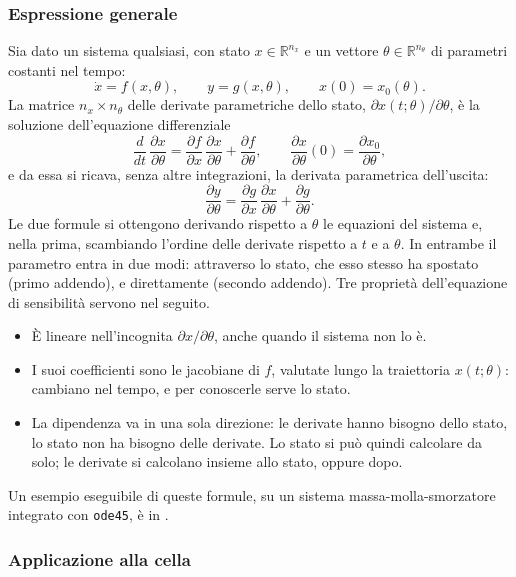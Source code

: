\documentclass[11pt,a4paper]{article}
\newcommand{\file}[1]{\texttt{\detokenize{#1}}}
\begin{document}
\subsubsection{Espressione generale}

Sia dato un sistema qualsiasi, con stato $x \in \mathbb{R}^{n_x}$ e un vettore
$\theta \in \mathbb{R}^{n_\theta}$ di parametri costanti nel tempo:
\[
  \dot x = f(x, \theta), \qquad y = g(x, \theta), \qquad x(0) = x_0(\theta) .
\]
La matrice $n_x \times n_\theta$ delle derivate parametriche dello stato,
$\partial x(t;\theta)/\partial\theta$, è la soluzione dell'equazione
differenziale
\[
  \frac{d}{dt}\,\frac{\partial x}{\partial \theta}
    = \frac{\partial f}{\partial x}\,\frac{\partial x}{\partial \theta}
      + \frac{\partial f}{\partial \theta} ,
  \qquad
  \frac{\partial x}{\partial \theta}(0) = \frac{\partial x_0}{\partial \theta} ,
\]
e da essa si ricava, senza altre integrazioni, la derivata parametrica
dell'uscita:
\[
  \frac{\partial y}{\partial \theta}
    = \frac{\partial g}{\partial x}\,\frac{\partial x}{\partial \theta}
      + \frac{\partial g}{\partial \theta} .
\]
Le due formule si ottengono derivando rispetto a $\theta$ le equazioni del
sistema e, nella prima, scambiando l'ordine delle derivate rispetto a $t$ e a
$\theta$. In entrambe il parametro entra in due modi: attraverso lo stato, che
esso stesso ha spostato (primo addendo), e direttamente (secondo addendo). Tre
proprietà dell'equazione di sensibilità servono nel seguito.
\begin{itemize}
  \item È lineare nell'incognita $\partial x/\partial\theta$, anche quando il
        sistema non lo è.
  \item I suoi coefficienti sono le jacobiane di $f$, valutate lungo la
        traiettoria $x(t;\theta)$: cambiano nel tempo, e per conoscerle serve
        lo stato.
  \item La dipendenza va in una sola direzione: le derivate hanno bisogno dello
        stato, lo stato non ha bisogno delle derivate. Lo stato si può quindi
        calcolare da solo; le derivate si calcolano insieme allo stato, oppure
        dopo.
\end{itemize}
Un esempio eseguibile di queste formule, su un sistema massa-molla-smorzatore
integrato con \texttt{ode45}, è in \file{esempio_sensibilita_ode45.m}.

\subsubsection{Applicazione alla cella}
\end{document}
